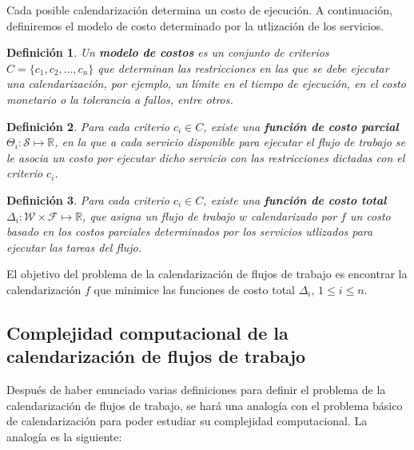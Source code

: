 \documentclass[letterpaper, 12pt]{report}
\newtheorem{defn}{Definición}
\begin{document}
Cada posible calendarización determina un costo de ejecución. A continuación, definiremos el modelo de costo determinado por la utlización de los servicios.

\begin{defn}
Un \textbf{modelo de costos} es un conjunto de criterios $C = \{c_1, c_2, \dots, c_n\}$ que determinan las restricciones en las que se debe ejecutar una calendarización, por ejemplo, un límite en el tiempo de ejecución, en el costo monetario o la tolerancia a fallos, entre otros.
\end{defn}

\begin{defn}
Para cada criterio $c_i \in C$, existe una \textbf{función de costo parcial} $\Theta_i : \mathcal{S} \mapsto \mathbb{R}$, en la que a cada servicio disponible para ejecutar el flujo de trabajo se le asocia un costo por ejecutar dicho servicio con las restricciones dictadas con el criterio $c_i$.
\end{defn}

\begin{defn}
Para cada criterio $c_i \in C$, existe una \textbf{función de costo total} $\Delta_i : \mathcal{W} \times \mathcal{F} \mapsto \mathbb{R}$, que asigna un flujo de trabajo $w$ calendarizado por $f$ un costo basado en los costos parciales determinados por los servicios utlizados para ejecutar las tareas del flujo.
\end{defn}

El objetivo del problema de la calendarización de flujos de trabajo es encontrar la calendarización $f$ que minimice las funciones de costo total $\Delta_i$, $1 \le i \le n$.

\subsection{Complejidad computacional de la calendarización de flujos de trabajo}
Después de haber enunciado varias definiciones para definir el problema de la calendarización de flujos de trabajo, se hará una analogía con el problema básico de calendarización para poder estudiar su complejidad computacional. La analogía es la siguiente:
\end{document}

